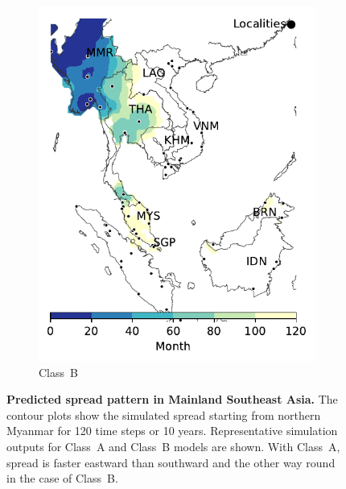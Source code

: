 \documentclass[11pt]{article}
\theoremstyle{definition}
\begin{document}
\begin{figure}[ht]
\begin{subfigure}[b]{.47\textwidth}
    \includegraphics[width=\textwidth]{../cellular_automata/results/contour/MSA_model-B_m1_l3.pdf}
    \caption{Class~B\label{fig:msaClassB}}
\end{subfigure}
\caption{\textbf{Predicted spread pattern in Mainland Southeast Asia.} The
contour plots show the simulated spread starting from northern Myanmar for
120 time steps or 10 years. Representative simulation outputs for Class~A
and Class~B models are shown. With {Class~A}, spread is faster eastward
than southward and the other way round in the case of
Class~B.\label{fig:msaClassAB} }
\end{figure}
\end{document}
